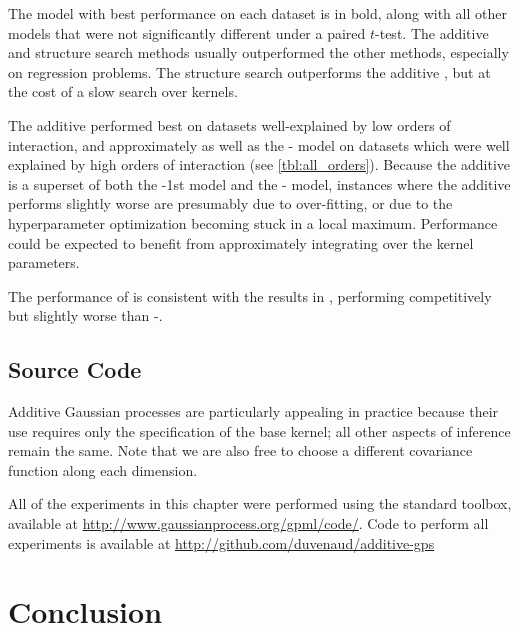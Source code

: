 The model with best performance on each dataset is in bold, along with all other models that were not significantly different under a paired $t$-test.
The additive and structure search methods usually outperformed the other methods, especially on regression problems.
The structure search outperforms the additive \gp{}, but at the cost of a slow search over kernels.


The additive \gp{} performed best on datasets well-explained by low orders of interaction, and approximately as well as the \SE{}-\gp{} model on datasets which were well explained by high orders of interaction (see \cref{tbl:all_orders}).
Because the additive \gp{} is a superset of both the \gp{}-1st model and the \kSE{}-\gp{} model, instances where the additive \gp{} performs slightly worse are presumably due to over-fitting, or due to the hyperparameter optimization becoming stuck in a local maximum. %
Performance could be expected to benefit from approximately integrating over the kernel parameters.

The performance of \HKL{} is consistent with the results in \citep{DBLP:journals/corr/abs-0909-0844}, performing competitively but slightly worse than \SE{}-\gp{}.%


\subsection{Source Code}
Additive Gaussian processes are particularly appealing in practice because their use requires only the specification of the base kernel; all other aspects of \gp{} inference remain the same.
Note that we are also free to choose a different covariance function along each dimension.

All of the experiments in this chapter were performed using the standard \GPML{} toolbox, available at \url{http://www.gaussianprocess.org/gpml/code/}.
Code to perform all experiments is available at \url{http://github.com/duvenaud/additive-gps}





\section{Conclusion}

